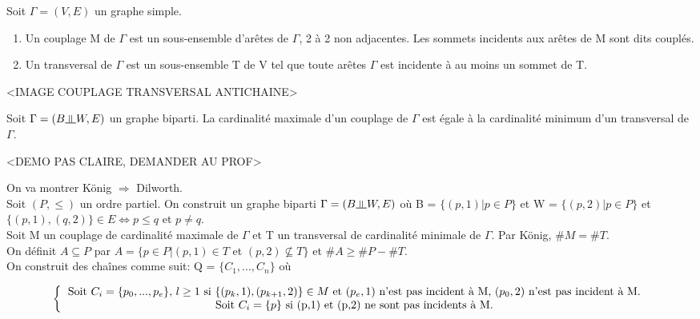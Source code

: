 \begin{thrm}
Soit $\Gamma = (V,E)$ un graphe simple. 
	\begin{enumerate}
		\item Un couplage M de $\Gamma$ est un sous-ensemble d'arêtes de $\Gamma$, 2 à 2 non adjacentes. Les sommets incidents aux arêtes de M sont dits couplés.
		\item Un transversal de $\Gamma$ est un sous-ensemble T de V tel que toute arêtes $\Gamma$ est incidente à au moins un sommet de T.\\
	\end{enumerate}
\end{thrm}

<IMAGE COUPLAGE TRANSVERSAL ANTICHAINE>

\begin{thrm}[König]
Soit $\Gamma = (B \vmodels W, E)$ un graphe biparti. La cardinalité maximale d'un couplage de $\Gamma$ est égale à la cardinalité minimum d'un transversal de $\Gamma$.
\end{thrm}

\begin{demo}
<DEMO PAS CLAIRE, DEMANDER AU PROF>
\end{demo}

\newpage


\begin{demo}
On va montrer König $\Rightarrow$ Dilworth.\\

Soit $(P,\leq)$ un ordre partiel. On construit un graphe biparti $\Gamma = ( B \vmodels W, E)$ où B = $\{ (p,1) | p \in P \}$ et W = $\{ (p,2) | p \in P \}$ et $\{ (p,1) , (q,2) \} \in E \Leftrightarrow p \leq q$ et $ p \neq q$. \\

Soit M un couplage de cardinalité maximale de $\Gamma$ et T un transversal de cardinalité minimale de $\Gamma$. Par König, $\#M = \#T$.\\

On définit $A \subseteq P$ par $A = \{ p \in P | (p,1) \in T$ et $(p,2) \nsubseteq T \}$ et $\#A \geq \#P - \#T$. \\

On construit des chaînes comme suit: Q = $\{ C_{1},...,C_{n} \}$ où

\[ 
\left \{
  \begin{tabular}{c}
  Soit $C_{i}=\{ p_{0},...,p_{e}\}$, $l\geq 1$ si $\{ (p_{k},1), (p_{k+1},2)\} \in M$ et $(p_{e},1)$ n'est pas incident à M, $(p_{0},2)$ n'est pas incident à M. \\
  Soit $C_{i}=\{p\}$ si (p,1) et (p,2) ne sont pas incidents à M.\\ 
  \end{tabular}
\right .
\]
\end{demo}

